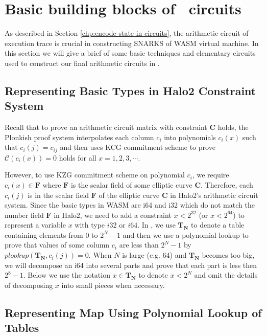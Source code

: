 \section{Basic building blocks of \zkwasm\ circuits}
\label{chp:build-blocks}
As described in Section \ref{chp:encode-state-in-circuits}, the arithmetic circuit of execution trace is crucial in constructing SNARKS of WASM virtual machine. In this section we will give a brief of some basic techniques and elementary circuits used to construct our final arithmetic circuits in \zkwasm.



\subsection{Representing Basic Types in Halo2 Constraint System}

Recall that to prove an arithmetic circuit matrix with constraint $\mathbf{C}$ holds, the Plonkish proof system interpolates each column $c_i$ into polynomials $c_i(x)$ such that $c_i(j) = c_{ij}$ and then uses KCG commitment scheme to prove $\mathcal{C}(c_i(x)) = 0$ holds for all $x=1,2,3,\cdots$. 

However, to use KZG commitment scheme on polynomial $c_i$, we require $c_i(x) \in \mathbf{F}$ where $\mathbf{F}$ is the scalar field of some elliptic curve $\mathbf{C}$. Therefore, each $c_i(j)$ is in the scalar field $\mathbf{F}$ of the elliptic curve $\mathbf{C}$ in Halo2's arithmetic circuit system. Since the basic types in WASM are i64 and i32 which do not match the number field $\mathbf{F}$ in Halo2, we need to add a constraint $x<2^{32}$ (or $x< 2^{64}$) to represent a variable $x$ with type $i32$ or $i64$. In \zkwasm, we use $\mathbf{T_N}$ to denote a table containing elements from $0$ to $2^N-1$ and then we use a polynomial lookup to prove that values of some column $c_i$ are less than $2^N-1$ by $plookup(\mathbf{T_N}, c_i(j)) = 0$. When $N$ is large (e.g. 64) and $\mathbf{T_N}$ becomes too big, we will decompose an i64 into several parts and prove that each part is less then $2^8-1$. Below we use the notation $x \in \mathbf{T_N}$ to denote $x < 2^N$ and omit the details of decomposing $x$ into small pieces when necessary.

\subsection{Representing Map Using Polynomial Lookup of Tables}
\label{chp:map-repr}

